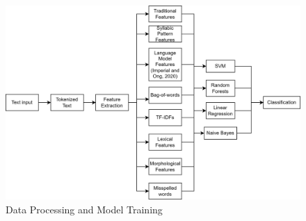 \begin{figure}[h]
\includegraphics[width=\textwidth,height=\textheight,keepaspectratio]{figures/Model Training.png}
  \caption{Data Processing and Model Training}
  \label{fig:Model}
\end{figure}

\clearpage

